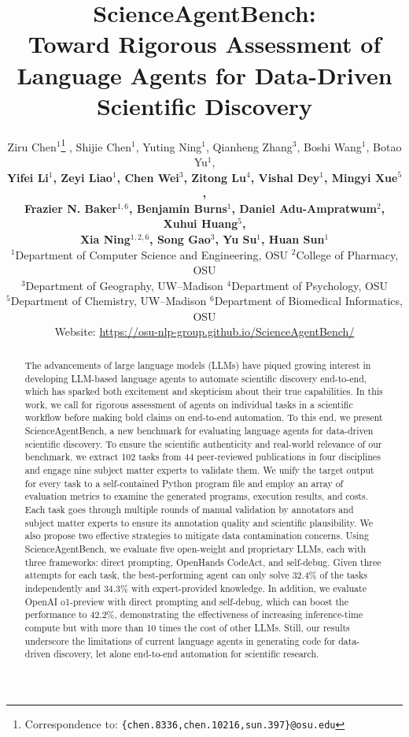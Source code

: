 \documentclass{article} %
\title{ScienceAgentBench:\\Toward Rigorous Assessment of Language Agents for Data-Driven Scientific Discovery}
\author{Ziru Chen$^1$\thanks{Correspondence to: \texttt{\{chen.8336,chen.10216,sun.397\}@osu.edu}} , Shijie Chen$^1$\footnotemark[\value{footnote}] , Yuting Ning$^1$, Qianheng Zhang$^3$, Boshi Wang$^1$, Botao Yu$^1$,  \\
\textbf{Yifei Li$^1$, Zeyi Liao$^1$, Chen Wei$^3$, Zitong Lu$^4$, Vishal Dey$^1$, Mingyi Xue$^5$,} \\
\textbf{Frazier N. Baker$^{1,6}$, Benjamin Burns$^1$, Daniel Adu-Ampratwum$^2$, Xuhui Huang$^5$, } \\
\textbf{Xia Ning$^{1,2,6}$, Song Gao$^3$, Yu Su$^1$, Huan Sun$^1$\footnotemark[\value{footnote}]}\\
$^1$Department of Computer Science and Engineering, OSU 
\quad 
$^2$College of Pharmacy, OSU \\
$^3$Department of Geography, UW–Madison \quad $^4$Department of Psychology, OSU \\
$^5$Department of Chemistry, UW–Madison \quad
$^6$Department of Biomedical Informatics, OSU \\ 
Website: \url{https://osu-nlp-group.github.io/ScienceAgentBench/}
}
\newcommand{\bench}{ScienceAgentBench\xspace}
\begin{document}
\maketitle

\begin{abstract}
The advancements of large language models (LLMs) have piqued growing interest in developing LLM-based language agents to automate scientific discovery end-to-end, which has sparked both excitement and skepticism about their true capabilities. 
In this work, we call for rigorous assessment of agents on individual tasks in a scientific workflow before making bold claims on end-to-end automation.
To this end, we present \bench, a new benchmark for evaluating language agents for data-driven scientific discovery. 
To ensure the scientific authenticity and real-world relevance of our benchmark, we extract 102 tasks from 44 peer-reviewed publications in four disciplines and engage nine subject matter experts to validate them.
We unify the target output for every task to a self-contained Python program file and employ an array of evaluation metrics to examine the generated programs, execution results, and costs.
Each task goes through multiple rounds of manual validation by annotators and subject matter experts to ensure its annotation quality and scientific plausibility. 
We also propose two effective strategies to mitigate data contamination concerns.
Using ScienceAgentBench, we evaluate five open-weight and proprietary LLMs, each with three frameworks: direct prompting, OpenHands CodeAct, and self-debug. 
Given three attempts for each task, the best-performing agent can only solve 32.4\% of the tasks independently and 34.3\% with expert-provided knowledge.
In addition, we evaluate OpenAI o1-preview with direct prompting and self-debug, which can boost the performance to 42.2\%, demonstrating the effectiveness of increasing inference-time compute but with more than 10 times the cost of other LLMs.
Still, our results underscore the limitations of current language agents in generating code for data-driven discovery, let alone end-to-end automation for scientific research.
\end{abstract}
\end{document}
